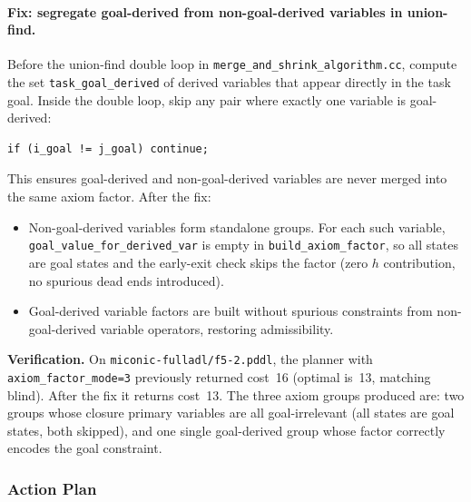 \documentclass[11pt,a4paper]{article}
\begin{document}
\paragraph{Fix: segregate goal-derived from non-goal-derived variables in union-find.}

Before the union-find double loop in \texttt{merge\_and\_shrink\_algorithm.cc},
compute the set \texttt{task\_goal\_derived} of derived variables that appear
directly in the task goal.  Inside the double loop, skip any pair where exactly
one variable is goal-derived:

\begin{verbatim}
if (i_goal != j_goal) continue;
\end{verbatim}

This ensures goal-derived and non-goal-derived variables are never merged into
the same axiom factor.  After the fix:

\begin{itemize}

  \item Non-goal-derived variables form standalone groups.  For each such
    variable, \texttt{goal\_value\_for\_derived\_var} is empty in
    \texttt{build\_axiom\_factor}, so all states are goal states and the
    early-exit check skips the factor (zero $h$ contribution, no spurious
    dead ends introduced).

  \item Goal-derived variable factors are built without spurious constraints
    from non-goal-derived variable operators, restoring admissibility.

\end{itemize}

\textbf{Verification.}  On \texttt{miconic-fulladl/f5-2.pddl}, the planner
with \texttt{axiom\_factor\_mode=3} previously returned cost~16 (optimal
is~13, matching blind).  After the fix it returns cost~13.  The three axiom
groups produced are: two groups whose closure primary variables are all
goal-irrelevant (all states are goal states, both skipped), and one single
goal-derived group whose factor correctly encodes the goal constraint.

\subsubsection{Action Plan}
\label{sec:action-plan}
\end{document}
